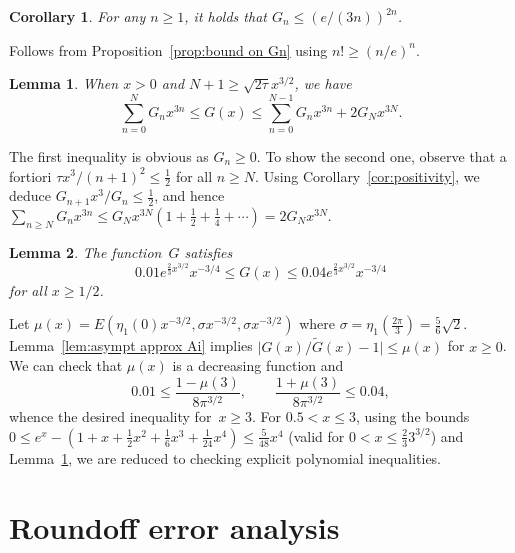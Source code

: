 \documentclass[10pt, conference]{IEEEtran}
\newcommand{\abs}[1]{\mathopen|#1\mathclose|}
\newtheorem{corollary}{Corollary}
\newtheorem{lemma}{Lemma}
\begin{document}
\begin{corollary} \mightbeomitted
  \label{cor:upper bound on Gn}  For any $n \ge 1$, it holds that $G_n \le (e/(3n))^{2n}$.
\end{corollary}
\begin{IEEEproof}
  Follows from Proposition~\ref{prop:bound on Gn} using $n! \ge (n/e)^n$.
\end{IEEEproof}

\begin{lemma}
  \label{lem:remainder G}
  When $x>0$ and $N+1 \ge \sqrt{2\tau} x^{3/2}$, we have
\[ \sum_{n=0}^{N} G_n x^{3n} \le G(x) \le \sum_{n=0}^{N-1} G_n x^{3n} + 2G_N x^{3N}. \]
\end{lemma}
\begin{IEEEproof}
  The first inequality is obvious as $G_n \ge 0$. To show the second one, observe that a fortiori $\tau x^3/(n+1)^2 \le \frac12$ for all $n \ge N$. Using Corollary~\ref{cor:positivity}, we deduce $G_{n+1} x^3/G_n \le \frac12$, and hence $\sum_{n \ge N} G_n x^{3n} \le G_N x^{3N} (1 + \frac12 + \frac14 + \cdots) = 2G_N x^{3N}.$
\end{IEEEproof}

\begin{lemma} \mightbeomitted
  \label{lem:bounds G}The function~$G$ satisfies
  \[ 0.01 e^{\frac{2}{3} x^{3 / 2}} x^{- 3 / 4} \leq G(x)
     \leq 0.04 e^{\frac{2}{3} x^{3 / 2}} x^{- 3 / 4} \]
  for all $x \geq 1/2$.
\end{lemma}
\begin{IEEEproof}
Let $\mu(x) = E (\eta_1(0) x^{- 3 / 2}, \sigma x^{- 3 / 2}, \sigma x^{- 3 / 2})$ where $\sigma = \eta_1(\frac{2 \pi}{3}) = \frac{5}{6} \sqrt{2}$.
  Lemma~\ref{lem:asympt approx Ai} implies
  $ \abs{G(x)/\tilde{G}(x) - 1} \leq \mu(x)$
  for $x \geq 0$. We can check that $\mu(x)$ is a decreasing function and
  \[ 0.01 \leq \frac{1 - \mu(3)}{8 \pi^{3 / 2}},
     \hspace{2em} \frac{1 + \mu(3)}{8 \pi^{3 / 2}} \leq
     0.04, \]
  whence the desired inequality for~$x \geq 3$.
  For $0.5 < x \le 3$, using the bounds
  $0
  \leq e^x - (1 + x + \frac12 x^2 + \frac16 x^3 + \frac{1}{24} x^4)
  \leq \frac{5}{48} x^4$
  (valid for $0 < x \le \frac23 3^{3/2}$) and Lemma~\ref{lem:remainder G}, we are reduced to checking explicit polynomial inequalities.
\end{IEEEproof}



\section{Roundoff error analysis}
\label{sec:roundoff Analysis}
\end{document}

